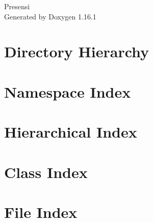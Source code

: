 \documentclass[twoside]{book}
\newcommand{\+}{\discretionary{\mbox{\scriptsize$\hookleftarrow$}}{}{}}
\newcommand{\clearemptydoublepage}{%
    \newpage{\pagestyle{empty}\cleardoublepage}%
  }
\begin{document}
  \raggedbottom
    \hypersetup{pageanchor=false,
                bookmarksnumbered=true,
                pdfencoding=unicode
               }
  \begin{titlepage}
  \vspace*{7cm}
  \begin{center}%
  {\Large Presensi}\\
  \vspace*{1cm}
  {\large Generated by Doxygen 1.16.1}\\
  \end{center}
  \end{titlepage}
  \clearemptydoublepage
  \tableofcontents
  \clearemptydoublepage
  \hypersetup{pageanchor=true}

\chapter{Directory Hierarchy}

\chapter{Namespace Index}

\chapter{Hierarchical Index}

\chapter{Class Index}

\chapter{File Index}

\end{document}
